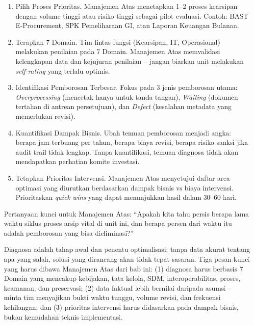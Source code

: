 \documentclass[12pt,a4paper]{report}
\begin{document}
\begin{enumerate}[leftmargin=*]
    \item Pilih Proses Prioritas. Manajemen Atas menetapkan 1--2 proses kearsipan dengan volume tinggi atau risiko tinggi sebagai pilot evaluasi. Contoh: BAST E-Procurement, SPK Pemeliharaan GI, atau Laporan Keuangan Bulanan.
    \item Terapkan 7 Domain. Tim lintas fungsi (Kearsipan, IT, Operasional) melakukan penilaian pada 7 Domain. Manajemen Atas memvalidasi kelengkapan data dan kejujuran penilaian -- jangan biarkan unit melakukan \textit{self-rating} yang terlalu optimis.
    \item Identifikasi Pemborosan Terbesar. Fokus pada 3 jenis pemborosan utama: \textit{Overprocessing} (mencetak hanya untuk tanda tangan), \textit{Waiting} (dokumen tertahan di antrean persetujuan), dan \textit{Defect} (kesalahan metadata yang memerlukan revisi).
    \item Kuantifikasi Dampak Bisnis. Ubah temuan pemborosan menjadi angka: berapa jam terbuang per tahun, berapa biaya revisi, berapa risiko sanksi jika audit trail tidak lengkap. Tanpa kuantifikasi, temuan diagnosa tidak akan mendapatkan perhatian komite investasi.
    \item Tetapkan Prioritas Intervensi. Manajemen Atas menyetujui daftar area optimasi yang diurutkan berdasarkan dampak bisnis vs biaya intervensi. Prioritaskan \textit{quick wins} yang dapat menunjukkan hasil dalam 30--60 hari.
\end{enumerate}

Pertanyaan kunci untuk Manajemen Atas: ``Apakah kita tahu persis berapa lama waktu siklus proses arsip vital di unit ini, dan berapa persen dari waktu itu adalah pemborosan yang bisa dieliminasi?''

\begin{plnbox}
Diagnosa adalah tahap awal dan penentu optimalisasi: tanpa data akurat tentang apa yang salah, solusi yang dirancang akan tidak tepat sasaran. Tiga pesan kunci yang harus dibawa Manajemen Atas dari bab ini: (1) diagnosa harus berbasis 7 Domain yang mencakup kebijakan, tata kelola, SDM, interoperabilitas, proses, keamanan, dan preservasi; (2) data faktual lebih bernilai daripada asumsi -- minta tim menyajikan bukti waktu tunggu, volume revisi, dan frekuensi kehilangan; dan (3) prioritas intervensi harus didasarkan pada dampak bisnis, bukan kemudahan teknis implementasi.
\end{plnbox}
\end{document}
